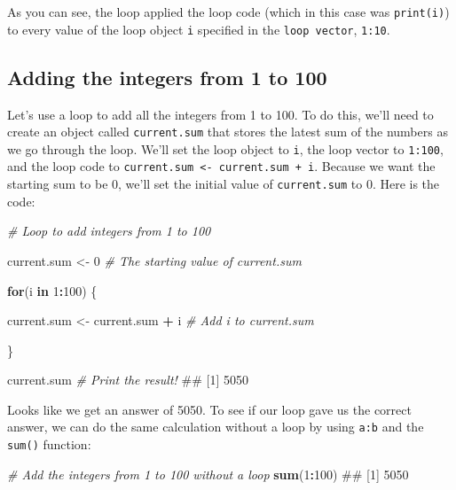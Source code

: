\documentclass[]{book}
\newenvironment{Shaded}{\begin{snugshade}}{\end{snugshade}}
\newcommand{\KeywordTok}[1]{\textcolor[rgb]{0.13,0.29,0.53}{\textbf{#1}}}
\newcommand{\DecValTok}[1]{\textcolor[rgb]{0.00,0.00,0.81}{#1}}
\newcommand{\StringTok}[1]{\textcolor[rgb]{0.31,0.60,0.02}{#1}}
\newcommand{\CommentTok}[1]{\textcolor[rgb]{0.56,0.35,0.01}{\textit{#1}}}
\newcommand{\ControlFlowTok}[1]{\textcolor[rgb]{0.13,0.29,0.53}{\textbf{#1}}}
\newcommand{\OperatorTok}[1]{\textcolor[rgb]{0.81,0.36,0.00}{\textbf{#1}}}
\newcommand{\NormalTok}[1]{#1}
\theoremstyle{definition}
\theoremstyle{definition}
\theoremstyle{remark}
\begin{document}
As you can see, the loop applied the loop code (which in this case was
\texttt{print(i)}) to every value of the loop object \texttt{i}
specified in the \texttt{loop\ vector}, \texttt{1:10}.

\subsection{Adding the integers from 1 to
100}\label{adding-the-integers-from-1-to-100}

Let's use a loop to add all the integers from 1 to 100. To do this,
we'll need to create an object called \texttt{current.sum} that stores
the latest sum of the numbers as we go through the loop. We'll set the
loop object to \texttt{i}, the loop vector to \texttt{1:100}, and the
loop code to \texttt{current.sum\ \textless{}-\ current.sum\ +\ i}.
Because we want the starting sum to be 0, we'll set the initial value of
\texttt{current.sum} to 0. Here is the code:

\begin{Shaded}
\begin{Highlighting}[]
\CommentTok{# Loop to add integers from 1 to 100}

\NormalTok{current.sum <-}\StringTok{ }\DecValTok{0} \CommentTok{# The starting value of current.sum}

\ControlFlowTok{for}\NormalTok{(i }\ControlFlowTok{in} \DecValTok{1}\OperatorTok{:}\DecValTok{100}\NormalTok{) \{}

\NormalTok{ current.sum <-}\StringTok{ }\NormalTok{current.sum }\OperatorTok{+}\StringTok{ }\NormalTok{i }\CommentTok{# Add i to current.sum}

\NormalTok{\}}

\NormalTok{current.sum }\CommentTok{# Print the result!}
\NormalTok{## [1] 5050}
\end{Highlighting}
\end{Shaded}

Looks like we get an answer of 5050. To see if our loop gave us the
correct answer, we can do the same calculation without a loop by using
\texttt{a:b} and the \texttt{sum()} function:

\begin{Shaded}
\begin{Highlighting}[]
\CommentTok{# Add the integers from 1 to 100 without a loop}
\KeywordTok{sum}\NormalTok{(}\DecValTok{1}\OperatorTok{:}\DecValTok{100}\NormalTok{)}
\NormalTok{## [1] 5050}
\end{Highlighting}
\end{Shaded}
\end{document}

